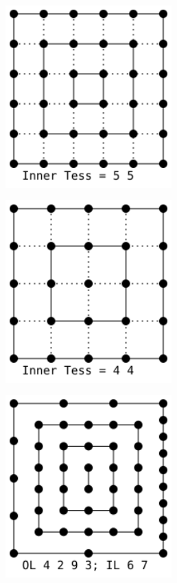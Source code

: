 \begin{figure}
	\centering
	\begin{subfigure}{0.40\textwidth}
			\includegraphics[height=7cm,width=\textwidth]{figures/QuadInnerOnlyQuadCorr.png}	
	\end{subfigure}
	\hfill
	\begin{subfigure}{0.40\textwidth}
			\includegraphics[height=7cm,width=\textwidth]{figures/QuadInnerOnlyPointCorr.png}	
	\end{subfigure}
	\newline
	\begin{subfigure}{0.40\textwidth}
			\includegraphics[height=7cm,width=\textwidth]{figures/QuadOuterAndNotris.png}	

\end{subfigure}
\end{figure}
